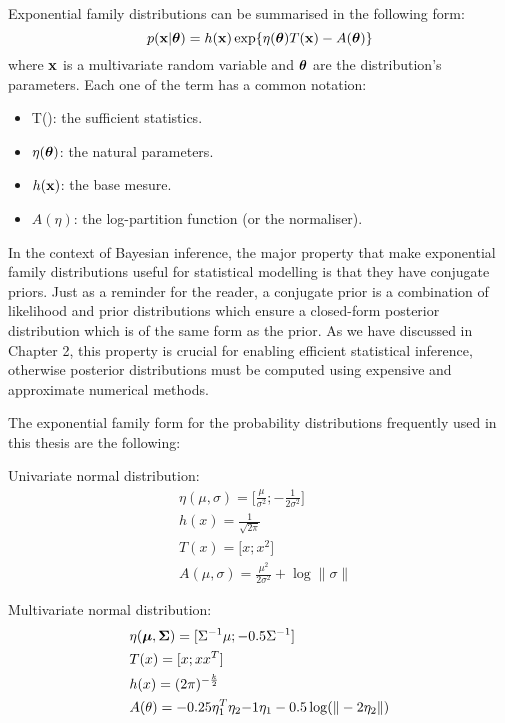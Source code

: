 Exponential family distributions can be summarised in the following form:
\begin{equation}
	p({\bf x}|\mbox{\boldmath $\theta$}) = h({\bf x}) \exp \{ \eta(\mbox{\boldmath $\theta$}) T({\bf x}) - A(\mbox{\boldmath $\theta$}) \}
\end{equation}
where ${\bf x}$ is a multivariate random variable and $\mbox{\boldmath $\theta$}$ are the distribution's parameters. Each one of the term has a common notation:
\begin{itemize}
	\item T(\bfx): the sufficient statistics.
	\item $\eta(\mbox{\boldmath $\theta$})$: the natural parameters.
	\item $h({\bf x})$: the base mesure.
	\item $A(\eta)$: the log-partition function (or the normaliser).
\end{itemize}
In the context of Bayesian inference, the major property that make exponential family distributions useful for statistical modelling is that they have conjugate priors. Just as a reminder for the reader, a conjugate prior is a combination of likelihood and prior distributions which ensure a closed-form posterior distribution which is of the same form as the prior. As we have discussed in Chapter 2, this property is crucial for enabling efficient statistical inference, otherwise posterior distributions must be computed using expensive and approximate numerical methods.

The exponential family form for the probability distributions frequently used in this thesis are the following:

Univariate normal distribution:
\begin{align*}
	& \eta(\mu,\sigma) = \lbrack \frac{\mu}{\sigma^2}; -\frac{1}{2\sigma^2} \rbrack \\
	& h(x) = \frac{1}{\sqrt{2\pi}} \\
	& T(x) = \lbrack x; x^2 \rbrack \\
	& A(\mu,\sigma) = \frac{\mu^2}{2\sigma^2} + \log \| \sigma \|
\end{align*}

Multivariate normal distribution:
\begin{align*}
	& \eta(\mbox{\boldmath $\mu$},\mbox{\boldmath $\Sigma$})  = \lbrack\Sigma^{-1} \mu; -0.5\Sigma^{-1} \rbrack \\
	& T(x) = \lbrack x; xx^T \rbrack \\
	& h(x) = (2\pi)^{-\frac{k}{2}} \\
	& A(\theta) = -0.25\eta_1^T \eta_2{-1} \eta_1 - 0.5\log(\|-2\eta_2\|)
\end{align*}

